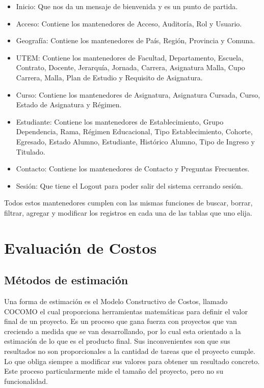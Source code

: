 \documentclass[a4paper,12pt,openany,oneside]{book}
\begin{document}
\begin{itemize}
	\item Inicio: Que nos da un mensaje de bienvenida y es un punto de partida.
	\item Acceso: Contiene los mantenedores de Acceso, Auditoría, Rol y Usuario.
	\item Geografía: Contiene los mantenedores de País, Región, Provincia y Comuna.
	\item UTEM: Contiene los mantenedores de Facultad, Departamento, Escuela, Contrato, Docente, Jerarquía, Jornada, Carrera, Asignatura Malla, Cupo Carrera, Malla, Plan de Estudio y Requisito de Asignatura.
	\item Curso: Contiene los mantenedores de Asignatura, Asignatura Cursada, Curso, Estado de Asignatura y Régimen.
	\item Estudiante: Contiene los mantenedores de Establecimiento, Grupo Dependencia, Rama, Régimen Educacional, Tipo Establecimiento, Cohorte, Egresado, Estado Alumno, Estudiante, Histórico Alumno, Tipo de Ingreso y Titulado.
	\item Contacto: Contiene los mantenedores de Contacto y Preguntas Frecuentes.
	\item Sesión: Que tiene el Logout para poder salir del sistema cerrando sesión.
\end{itemize}

Todos estos mantenedores cumplen con las mismas funciones de buscar, borrar, filtrar, agregar y modificar los registros en cada una de las tablas que uno elija.
\chapter{Evaluación de Costos}
\section{Métodos de estimación}
Una forma de estimación es el Modelo Constructivo de Costos, llamado COCOMO el cual proporciona herramientas matemáticas para definir el valor final de un proyecto. Es un proceso que gana fuerza con proyectos que van creciendo a medida que se van desarrollando, por lo cual esta orientado a la estimación de lo que es el producto final. Sus inconvenientes son que sus resultados no son proporcionales a la cantidad de tareas que el proyecto cumple. Lo que obliga siempre a modificar sus valores para obtener un resultado concreto. Este proceso particularmente mide el tamaño 
del proyecto, pero no su funcionalidad.
\end{document}
